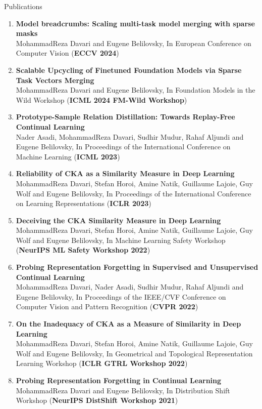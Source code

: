 \documentclass{resume} %
\newcommand{\pub}[3]{\textbf{#1}\\{\small #2} {\small (\textbf{#3})}} %
\begin{document}
\begin{rSection}{Publications}
\begin{enumerate}[leftmargin=0.0em]
    \item \pub{Model breadcrumbs: Scaling multi-task model merging with sparse masks}{MohammadReza Davari and Eugene Belilovsky, In European Conference on Computer Vision}{ECCV 2024}
    
    \item \pub{Scalable Upcycling of Finetuned Foundation Models via Sparse Task Vectors Merging}{MohammadReza Davari and Eugene Belilovsky, In Foundation Models in the Wild Workshop}{ICML 2024 FM-Wild Workshop}
        
    \item \pub{Prototype-Sample Relation Distillation: Towards Replay-Free Continual Learning}{Nader Asadi, MohammadReza Davari, Sudhir Mudur, Rahaf Aljundi and Eugene Belilovsky, In Proceedings of the International Conference on Machine Learning}{ICML 2023}

    \item \pub{Reliability of CKA as a Similarity Measure in Deep Learning}{MohammadReza Davari, Stefan Horoi, Amine Natik, Guillaume Lajoie, Guy Wolf and Eugene Belilovsky, In Proceedings of the International Conference on Learning Representations}{ICLR 2023}

    \item \pub{Deceiving the CKA Similarity Measure in Deep Learning}{MohammadReza Davari, Stefan Horoi, Amine Natik, Guillaume Lajoie, Guy Wolf and Eugene Belilovsky, In Machine Learning Safety Workshop}{NeurIPS ML Safety Workshop 2022}

    \item \pub{Probing Representation Forgetting in Supervised and Unsupervised Continual Learning}{MohammadReza Davari, Nader Asadi, Sudhir Mudur, Rahaf Aljundi and Eugene Belilovsky, In Proceedings of the IEEE/CVF Conference on Computer Vision and Pattern Recognition}{CVPR 2022}
    
    \item \pub{On the Inadequacy of CKA as a Measure of Similarity in Deep Learning}{MohammadReza Davari, Stefan Horoi, Amine Natik, Guillaume Lajoie, Guy Wolf and Eugene Belilovsky, In Geometrical and Topological Representation Learning Workshop}{ICLR GTRL Workshop 2022}

    \item \pub{Probing Representation Forgetting in Continual Learning}{MohammadReza Davari and Eugene Belilovsky, In Distribution Shift Workshop}{NeurIPS DistShift Workshop 2021}


\end{enumerate}
\end{rSection}
\end{document}
